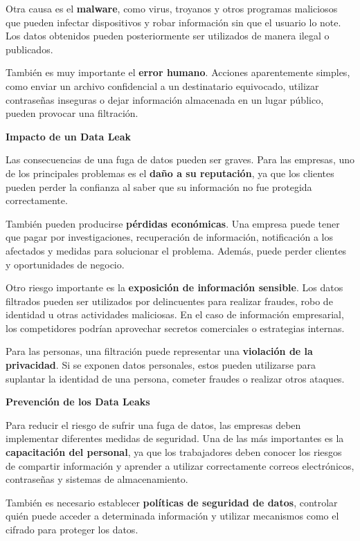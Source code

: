 \documentclass[]{article}
\begin{document}
Otra causa es el \textbf{malware}, como virus, troyanos y otros
programas maliciosos que pueden infectar dispositivos y robar
información sin que el usuario lo note. Los datos obtenidos pueden
posteriormente ser utilizados de manera ilegal o publicados.

También es muy importante el \textbf{error humano}. Acciones
aparentemente simples, como enviar un archivo confidencial a un
destinatario equivocado, utilizar contraseñas inseguras o dejar
información almacenada en un lugar público, pueden provocar una
filtración.

\textbf{Impacto de un Data Leak}

Las consecuencias de una fuga de datos pueden ser graves. Para las
empresas, uno de los principales problemas es el \textbf{daño a su
reputación}, ya que los clientes pueden perder la confianza al saber que
su información no fue protegida correctamente.

También pueden producirse \textbf{pérdidas económicas}. Una empresa
puede tener que pagar por investigaciones, recuperación de información,
notificación a los afectados y medidas para solucionar el problema.
Además, puede perder clientes y oportunidades de negocio.

Otro riesgo importante es la \textbf{exposición de información
sensible}. Los datos filtrados pueden ser utilizados por delincuentes
para realizar fraudes, robo de identidad u otras actividades maliciosas.
En el caso de información empresarial, los competidores podrían
aprovechar secretos comerciales o estrategias internas.

Para las personas, una filtración puede representar una
\textbf{violación de la privacidad}. Si se exponen datos personales,
estos pueden utilizarse para suplantar la identidad de una persona,
cometer fraudes o realizar otros ataques.

\textbf{Prevención de los Data Leaks}

Para reducir el riesgo de sufrir una fuga de datos, las empresas deben
implementar diferentes medidas de seguridad. Una de las más importantes
es la \textbf{capacitación del personal}, ya que los trabajadores deben
conocer los riesgos de compartir información y aprender a utilizar
correctamente correos electrónicos, contraseñas y sistemas de
almacenamiento.

También es necesario establecer \textbf{políticas de seguridad de
datos}, controlar quién puede acceder a determinada información y
utilizar mecanismos como el cifrado para proteger los datos.
\end{document}
